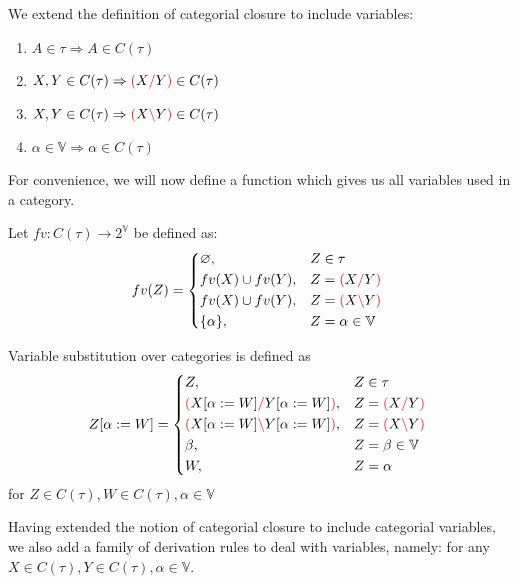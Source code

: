 \documentclass[main.tex]{subfiles}
\begin{document}
\begin{defn}
    We extend the definition of categorial closure to include variables:
    \begin{enumerate}
        \item \label{cvar:atomic} $A \in \tau \Rightarrow A \in C(\tau)$
        \item \label{cvar:right}  $X, Y \in C(\tau) \Rightarrow \textcolor{red}{(} X \textcolor{red}{/} Y \textcolor{red}{)} \in C(\tau)$
        \item \label{cvar:left}   $X, Y \in C(\tau) \Rightarrow \textcolor{red}{(} X \textcolor{red}{\backslash} Y \textcolor{red}{)} \in C(\tau)$
        \item \label{cvar:var}    $\alpha \in \mathbb{V} \Rightarrow \alpha \in C(\tau)$
    \end{enumerate}
\end{defn}

For convenience, we will now define a function which gives us all variables
used in a category.
\begin{defn}
    Let $fv: C(\tau) \rightarrow 2^{\mathbb{V}}$ be defined as:
    \[
        fv(Z) =
        \begin{cases*}
            \varnothing, & $Z \in \tau$ \\
            fv(X) \cup fv(Y), & $Z = \lp X \rc Y \rp$ \\
            fv(X) \cup fv(Y), & $Z = \lp X \lc Y \rp$ \\
            \{ \alpha \}, & $Z = \alpha \in \mathbb{V}$ \\
        \end{cases*}
    \]
\end{defn}
\begin{defn}
    Variable substitution over categories is defined as
    \[
        \subst{Z}{\alpha}{W} =
        \begin{cases*}
            Z, & $Z \in \tau$ \\
            \lp \subst{X}{\alpha}{W} \rc \subst{Y}{\alpha}{W} \rp, & $Z = \lp X \rc Y \rp$ \\
            \lp \subst{X}{\alpha}{W} \lc \subst{Y}{\alpha}{W} \rp, & $Z = \lp X \lc Y \rp$ \\
            \beta, & $Z = \beta \in \mathbb{V}$ \\
            W, & $Z = \alpha$ \\
        \end{cases*}
    \]
    for $Z \in C(\tau), W \in C(\tau), \alpha \in \mathbb{V}$
\end{defn}

Having extended the notion of categorial closure to include categorial variables,
we also add a family of derivation rules to deal with variables, namely:
for any $X \in C(\tau), Y \in C(\tau), \alpha \in \mathbb{V}$.
\end{document}
